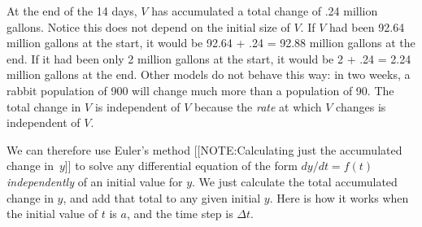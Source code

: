 At the end of the 14 days, $V$ has accumulated a total change of .24
million gallons.  Notice this does not depend on the initial size of
$V$.  If $V$ had been 92.64 million gallons at the start, it would be
92.64 + .24 = 92.88 million gallons at the end.  If it had been only 2
million gallons at the start, it would be 2 + .24 = 2.24 million
gallons at the end.  Other models do not behave this way: in two
weeks, a rabbit population of 900 will change much more than a
population of 90.  The total change in $V$ is independent of $V$
because the {\em rate\/} at which $V$ changes is independent of $V$.

\enlargethispage*{20pt}
We can therefore use Euler's method 
[[NOTE:Calculating just  the accumulated  change in~$y$]]
to solve any differential equation of the form $dy/dt = f(t)$ {\em
  independently\/} of an initial value for $y$.  We just calculate the
total accumulated change in $y$, and add that total to any given
initial $y$.  Here is how it works when the initial value of $t$ is
$a$, and the time step is $\Delta t$.  \addtolength{\arraycolsep}{6pt}

